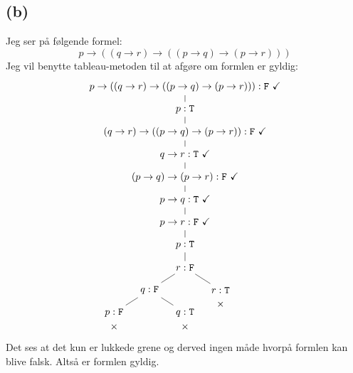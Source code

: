 \subsection*{(b)}
Jeg ser på følgende formel:
\begin{equation}
  p \rightarrow \left( \left( q \rightarrow r \right) \rightarrow \left( \left( p \rightarrow q \right) \rightarrow \left( p \rightarrow r \right) \right) \right)
\end{equation}
Jeg vil benytte tableau-metoden til at afgøre om formlen er gyldig:
\begin{equation*}
  \begin{tikzpicture}[level distance=8mm,sibling distance=50mm]\tikzstyle{level 2}=[sibling distance=25mm]
    \node{$p \rightarrow \left( \left( q \rightarrow r \right) \rightarrow \left( \left( p \rightarrow q \right) \rightarrow \left( p \rightarrow r \right) \right) \right) : \F\ \checkmark$}
    child {
      node {$p : \T$}
      child {
        node {$\left( q \rightarrow r \right) \rightarrow \left( \left( p \rightarrow q \right) \rightarrow \left( p \rightarrow r \right) \right) : \F\ \checkmark$}
        child {
          node {$q \rightarrow r : \T\ \checkmark$}
          child {
            node {$\left( p \rightarrow q \right) \rightarrow \left( p \rightarrow r \right) : \F\ \checkmark$}
            child {
              node {$p \rightarrow q : \T\ \checkmark$}
              child {
                node {$p \rightarrow r : \F\ \checkmark$}
                child {
                  node {$p : \T$}
                  child {
                    node {$r : \F$}
                    child {
                      node {$q : \F$}
                      child {
                        node {$p : \F$}
                        \closed
                      }
                      child {
                        node {$q : \T$}
                        \closed
                      }
                    }
                    child {
                      node {$r : \T$}
                      \closed
                    }
                  }
                }
              }
            }
          }
        }
      }
    };
  \end{tikzpicture}
\end{equation*}
Det ses at det kun er lukkede grene og derved ingen måde hvorpå formlen kan blive falsk. Altså er formlen gyldig.